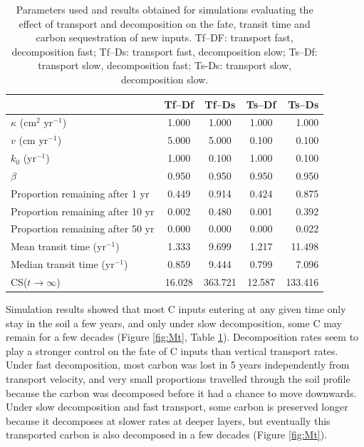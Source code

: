 \documentclass[11pt, oneside, a4paper]{article}   	%
\begin{document}
\begin{table}[h]
   \centering
   \caption{Parameters used and results obtained for simulations evaluating the effect of transport and decomposition on the fate, transit time and carbon sequestration of new inputs. Tf--DF: transport fast, decomposition fast; Tf--Ds: transport fast, decomposition slow; Ts--Df: transport slow, decomposition fast; Ts-Ds: transport slow, decomposition slow.}
   \begin{tabular}{@{} lcccr @{}} %
\toprule
 & Tf--Df & Tf--Ds & Ts--Df & Ts--Ds\\
\midrule
$\kappa$ (cm$^2$ yr$^{-1}$) & 1.000 & 1.000 & 1.000 & 1.000\\
$v$ (cm yr$^{-1}$) & 5.000 & 5.000 & 0.100 & 0.100\\
$k_0$ (yr$^{-1}$) & 1.000 & 0.100 & 1.000 & 0.100\\
$\beta$ & 0.950 & 0.950 & 0.950 & 0.950\\
Proportion remaining after 1 yr & 0.449   & 0.914 & 0.424  & 0.875\\
Proportion remaining after 10 yr & 0.002  & 0.480 & 0.001 &  0.392 \\
Proportion remaining after 50 yr & 0.000  & 0.000 & 0.000  & 0.022 \\
Mean transit time (yr$^{-1}$) & 1.333  & 9.699 & 1.217 & 11.498 \\
Median transit time (yr$^{-1}$) & 0.859  & 9.444 & 0.799  & 7.096 \\
CS($t \to \infty$) & 16.028 & 363.721 &12.587 &133.416 \\
\bottomrule
\end{tabular}
   \label{tab:simulationSetup}
\end{table}

Simulation results showed that most C inputs entering at any given time only stay in the soil a few years, and only under slow decomposition, some C may remain for a few decades (Figure \ref{fig:Mt}, Table \ref{tab:simulationSetup}). Decomposition rates seem to play a stronger control on the fate of C inputs than vertical transport rates. Under fast decomposition, most carbon was lost in 5 years independently from transport velocity, and very small proportions travelled through the soil profile because the carbon was decomposed before it had a chance to move downwards. Under slow decomposition and fast transport, some carbon is preserved longer because it decomposes at slower rates at deeper layers, but eventually this transported carbon is also decomposed in a few decades (Figure \ref{fig:Mt}).
\end{document}
